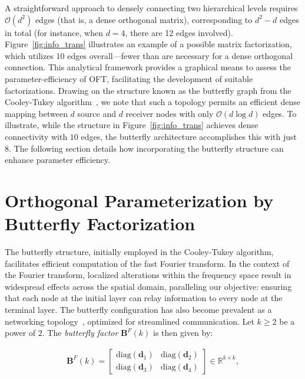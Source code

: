 A straightforward approach to densely connecting two hierarchical levels requires $\mathcal{O}(d^2)$ edges (that is, a dense orthogonal matrix), corresponding to $d^2-d$ edges in total (for instance, when $d=4$, there are 12 edges involved). Figure~\ref{fig:info_trans} illustrates an example of a possible matrix factorization, which utilizes $10$ edges overall—fewer than are necessary for a dense orthogonal connection. This analytical framework provides a graphical means to assess the parameter-efficiency of OFT, facilitating the development of suitable factorizations. Drawing on the structure known as the butterfly graph from the Cooley-Tukey algorithm~\cite{cooley1965algorithm}, we note that such a topology permits an efficient dense mapping between $d$ source and $d$ receiver nodes with only $\mathcal{O}(d\log d)$ edges. To illustrate, while the structure in Figure~\ref{fig:info_trans} achieves dense connectivity with $10$ edges, the butterfly architecture accomplishes this with just $8$. The following section details how incorporating the butterfly structure can enhance parameter efficiency.

\section{Orthogonal Parameterization by Butterfly Factorization}

The butterfly structure, initially employed in the Cooley-Tukey algorithm, facilitates efficient computation of the fast Fourier transform. In the context of the Fourier transform, localized alterations within the frequency space result in widespread effects across the spatial domain, paralleling our objective: ensuring that each node at the initial layer can relay information to every node at the terminal layer. The butterfly configuration has also become prevalent as a networking topology~\cite{solihin2015fundamentals,li2011linear}, optimized for streamlined communication. Let $k\geq 2$ be a power of $2$. The \emph{butterfly factor} $\bm{B}^F(k)$ is then given by:

\begin{equation}\label{eq:but_factor}
\begin{aligned}
    \bm{B}^F(k)=\begin{bmatrix}
    \text{diag}(\bm{d}_1) & \text{diag}(\bm{d}_2) \\
    \text{diag}(\bm{d}_3) & \text{diag}(\bm{d}_4)
    \end{bmatrix}\in\mathbb{R}^{k\times k},
\end{aligned}
\end{equation}

